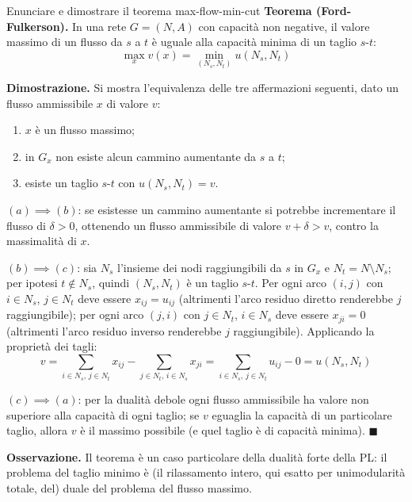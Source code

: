 \documentclass[12pt]{extarticle} %
\begin{document}
\begin{teoriabox}{Enunciare e dimostrare il teorema max-flow-min-cut}
\textbf{Teorema (Ford-Fulkerson).} In una rete $G=(N,A)$ con capacità non negative, il valore massimo di un flusso da $s$ a $t$ è uguale alla capacità minima di un taglio $s$-$t$:
\[
\max_x v(x) = \min_{(N_s,N_t)} u(N_s,N_t)
\]

\noindent\textbf{Dimostrazione.} Si mostra l'equivalenza delle tre affermazioni seguenti, dato un flusso ammissibile $x$ di valore $v$:
\begin{enumerate}
    \item[(a)] $x$ è un flusso massimo;
    \item[(b)] in $G_x$ non esiste alcun cammino aumentante da $s$ a $t$;
    \item[(c)] esiste un taglio $s$-$t$ con $u(N_s,N_t) = v$.
\end{enumerate}

\noindent $(a) \implies (b)$: se esistesse un cammino aumentante si potrebbe incrementare il flusso di $\delta > 0$, ottenendo un flusso ammissibile di valore $v + \delta > v$, contro la massimalità di $x$.

\noindent $(b) \implies (c)$: sia $N_s$ l'insieme dei nodi raggiungibili da $s$ in $G_x$ e $N_t = N\setminus N_s$; per ipotesi $t \notin N_s$, quindi $(N_s,N_t)$ è un taglio $s$-$t$. Per ogni arco $(i,j)$ con $i \in N_s$, $j \in N_t$ deve essere $x_{ij} = u_{ij}$ (altrimenti l'arco residuo diretto renderebbe $j$ raggiungibile); per ogni arco $(j,i)$ con $j \in N_t$, $i \in N_s$ deve essere $x_{ji} = 0$ (altrimenti l'arco residuo inverso renderebbe $j$ raggiungibile). Applicando la proprietà dei tagli:
\[
v = \sum_{i\in N_s,\, j\in N_t} x_{ij} - \sum_{j \in N_t,\, i \in N_s} x_{ji} = \sum_{i\in N_s,\, j\in N_t} u_{ij} - 0 = u(N_s,N_t)
\]

\noindent $(c) \implies (a)$: per la dualità debole ogni flusso ammissibile ha valore non superiore alla capacità di ogni taglio; se $v$ eguaglia la capacità di un particolare taglio, allora $v$ è il massimo possibile (e quel taglio è di capacità minima). $\blacksquare$

\noindent\textbf{Osservazione.} Il teorema è un caso particolare della dualità forte della PL: il problema del taglio minimo è (il rilassamento intero, qui esatto per unimodularità totale, del) duale del problema del flusso massimo.
\end{teoriabox}
\end{document}
